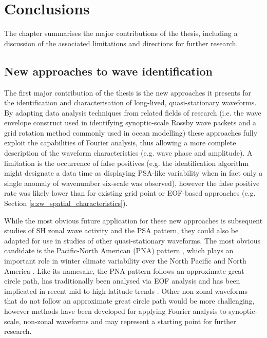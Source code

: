 
\chapter{Conclusions}


\begin{synopsis}

The chapter summarises the major contributions of the thesis, including a discussion of the associated limitations and directions for further research.

\end{synopsis}


\section{New approaches to wave identification}

The first major contribution of the thesis is the new approaches it presents for the identification and characterisation of long-lived, quasi-stationary waveforms. By adapting data analysis techniques from related fields of research (i.e. the wave envelope construct used in identifying synoptic-scale Rossby wave packets and a grid rotation method commonly used in ocean modelling) these approaches fully exploit the capabilities of Fourier analysis, thus allowing a more complete description of the waveform characteristics (e.g. wave phase and amplitude). A limitation is the occurrence of false positives (e.g. the identification algorithm might designate a data time as displaying PSA-like variability when in fact only a single anomaly of wavenumber six-scale was observed), however the false positive rate was likely lower than for existing grid point or EOF-based approaches (e.g. Section \ref{s:zw_spatial_characteristics}).

While the most obvious future application for these new approaches is subsequent studies of SH zonal wave activity and the PSA pattern, they could also be adapted for use in studies of other quasi-stationary waveforms. The most obvious candidate is the Pacific-North American (PNA) pattern \citep{Wallace1981}, which plays an important role in winter climate variability over the North Pacific and North America \citep[e.g.][]{Notaro2006}. Like its namesake, the PNA pattern follows an approximate great circle path, has traditionally been analysed via EOF analysis and has been implicated in recent mid-to-high latitude trends \citep[e.g.][]{Ding2014,Liu2015}. Other non-zonal waveforms that do not follow an approximate great circle path would be more challenging, however methods have been developed for applying Fourier analysis to synoptic-scale, non-zonal waveforms \citep{Zimin2006,Souders2014} and may represent a starting point for further research. 


